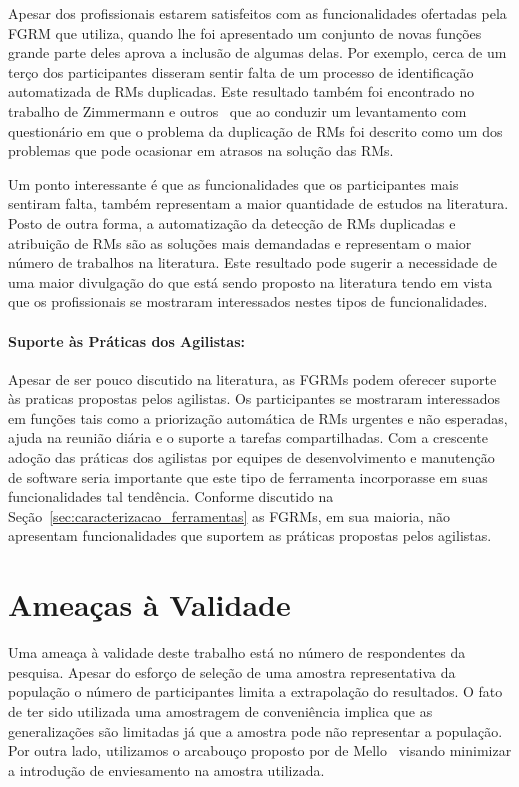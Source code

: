 Apesar dos profissionais estarem satisfeitos com as funcionalidades ofertadas
pela FGRM que utiliza, quando lhe foi apresentado um conjunto de novas funções
grande parte deles aprova a inclusão de algumas delas. Por exemplo, cerca de um
terço dos participantes disseram sentir falta de um processo de identificação
automatizada de RMs duplicadas. Este resultado também foi encontrado no
trabalho de Zimmermann e outros~\cite{zimmermann2010makes} que ao conduzir um
levantamento com questionário em que o problema da duplicação de RMs foi
descrito como um dos problemas que pode ocasionar em atrasos na solução das
RMs.

Um ponto interessante é que as funcionalidades que os participantes mais
sentiram falta, também representam a maior quantidade de estudos na literatura.
Posto de outra forma, a automatização da detecção de RMs duplicadas e
atribuição de RMs são as soluções mais demandadas e representam o maior número
de trabalhos na literatura. Este resultado pode sugerir a necessidade de uma
maior divulgação do que está sendo proposto na literatura tendo em vista que os
profissionais se mostraram interessados nestes tipos de funcionalidades.

\paragraph{Suporte às Práticas dos Agilistas:}\label{par:pesq_profissionais_suporte_pratica_agilistas}

Apesar de ser pouco discutido na literatura, as FGRMs podem oferecer suporte às
praticas propostas pelos agilistas. Os participantes se mostraram interessados
em funções tais como a priorização automática de RMs urgentes e não esperadas,
ajuda na reunião diária e o suporte a tarefas compartilhadas. Com a crescente
adoção das práticas dos agilistas por equipes de desenvolvimento e manutenção de
software seria importante que este tipo de ferramenta incorporasse em suas
funcionalidades tal tendência. Conforme discutido na
Seção~\ref{sec:caracterizacao_ferramentas} as FGRMs, em sua maioria, não
apresentam funcionalidades que suportem as práticas propostas pelos agilistas.

\section{Ameaças à Validade}\label{sec:pesquisa_profissionais_ameacas_validade}

Uma ameaça à validade deste trabalho está no número de respondentes da pesquisa.
Apesar do esforço de seleção de uma amostra representativa da população o número
de participantes limita a extrapolação do resultados. O fato de ter sido
utilizada uma amostragem de conveniência implica que as generalizações são
limitadas já que a amostra pode não representar a população. Por outra lado,
utilizamos o arcabouço proposto por de Mello~\cite{de2014towards} visando
minimizar a introdução de enviesamento na amostra utilizada.

